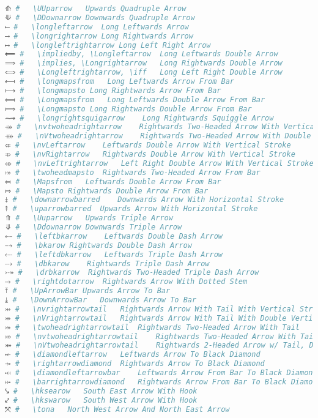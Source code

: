 \begin{lstlisting}[language=Julia, linewidth=\textwidth]
⟰ #   \UUparrow   Upwards Quadruple Arrow
⟱ #   \DDownarrow Downwards Quadruple Arrow
⟵ #   \longleftarrow  Long Leftwards Arrow
⟶ #   \longrightarrow Long Rightwards Arrow
⟷ #   \longleftrightarrow Long Left Right Arrow
⟸ #   \impliedby, \Longleftarrow  Long Leftwards Double Arrow
⟹ #   \implies, \Longrightarrow   Long Rightwards Double Arrow
⟺ #   \Longleftrightarrow, \iff   Long Left Right Double Arrow
⟻ #   \longmapsfrom   Long Leftwards Arrow From Bar
⟼ #   \longmapsto Long Rightwards Arrow From Bar
⟽ #   \Longmapsfrom   Long Leftwards Double Arrow From Bar
⟾ #   \Longmapsto Long Rightwards Double Arrow From Bar
⟿ #   \longrightsquigarrow    Long Rightwards Squiggle Arrow
⤀ #   \nvtwoheadrightarrow    Rightwards Two-Headed Arrow With Vertical Stroke
⤁ #   \nVtwoheadrightarrow    Rightwards Two-Headed Arrow With Double Vertical Stroke
⤂ #   \nvLeftarrow    Leftwards Double Arrow With Vertical Stroke
⤃ #   \nvRightarrow   Rightwards Double Arrow With Vertical Stroke
⤄ #   \nvLeftrightarrow   Left Right Double Arrow With Vertical Stroke
⤅ #   \twoheadmapsto  Rightwards Two-Headed Arrow From Bar
⤆ #   \Mapsfrom   Leftwards Double Arrow From Bar
⤇ #   \Mapsto Rightwards Double Arrow From Bar
⤈ #   \downarrowbarred    Downwards Arrow With Horizontal Stroke
⤉ #   \uparrowbarred  Upwards Arrow With Horizontal Stroke
⤊ #   \Uuparrow   Upwards Triple Arrow
⤋ #   \Ddownarrow Downwards Triple Arrow
⤌ #   \leftbkarrow    Leftwards Double Dash Arrow
⤍ #   \bkarow Rightwards Double Dash Arrow
⤎ #   \leftdbkarrow   Leftwards Triple Dash Arrow
⤏ #   \dbkarow    Rightwards Triple Dash Arrow
⤐ #   \drbkarrow  Rightwards Two-Headed Triple Dash Arrow
⤑ #   \rightdotarrow  Rightwards Arrow With Dotted Stem
⤒ #   \UpArrowBar Upwards Arrow To Bar
⤓ #   \DownArrowBar   Downwards Arrow To Bar
⤔ #   \nvrightarrowtail   Rightwards Arrow With Tail With Vertical Stroke
⤕ #   \nVrightarrowtail   Rightwards Arrow With Tail With Double Vertical Stroke
⤖ #   \twoheadrightarrowtail  Rightwards Two-Headed Arrow With Tail
⤗ #   \nvtwoheadrightarrowtail    Rightwards Two-Headed Arrow With Tail With Vert. Stroke
⤘ #   \nVtwoheadrightarrowtail    Rightwards 2-Headed Arrow w/ Tail, Double Vert. Stroke
⤝ #   \diamondleftarrow   Leftwards Arrow To Black Diamond
⤞ #   \rightarrowdiamond  Rightwards Arrow To Black Diamond
⤟ #   \diamondleftarrowbar    Leftwards Arrow From Bar To Black Diamond
⤠ #   \barrightarrowdiamond   Rightwards Arrow From Bar To Black Diamond
⤥ #   \hksearow   South East Arrow With Hook
⤦ #   \hkswarow   South West Arrow With Hook
⤧ #   \tona   North West Arrow And North East Arrow

\end{lstlisting}
